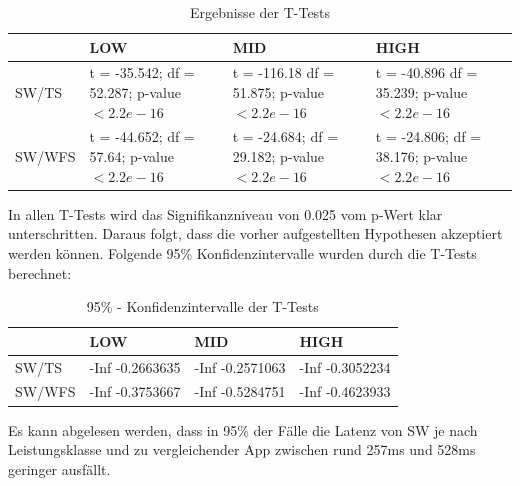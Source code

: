 \begin{table}[h]

\begin{tabular}{l|p{2cm}|p{2cm}|p{2cm}}
& LOW & MID & HIGH \\
\hline
SW/TS & t = -35.542; \newline df = 52.287; \newline p-value $< 2.2e-16$ & t = -116.18 \newline df = 51.875; \newline p-value $< 2.2e-16$ & t = -40.896 \newline df = 35.239; \newline p-value $< 2.2e-16$\\
\hline
SW/WFS & t = -44.652; \newline df = 57.64; \newline p-value $< 2.2e-16$ & t = -24.684; \newline df = 29.182; \newline p-value $< 2.2e-16$ & t = -24.806; \newline df = 38.176; \newline p-value $< 2.2e-16$ \\

\end{tabular}
\caption{Ergebnisse der T-Tests}
\end{table}

In allen T-Tests wird das Signifikanzniveau von 0.025 vom p-Wert klar unterschritten. Daraus folgt, dass die vorher aufgestellten Hypothesen akzeptiert werden können. Folgende 95\% Konfidenzintervalle wurden durch die T-Tests berechnet:

\begin{table}[h]

\begin{tabular}{l|p{2cm}|p{2cm}|p{2cm}}
& LOW & MID & HIGH \\
\hline
SW/TS & -Inf -0.2663635 & -Inf -0.2571063 & -Inf -0.3052234 \\
\hline
SW/WFS & -Inf -0.3753667 & -Inf -0.5284751 & -Inf -0.4623933 \\

\end{tabular}
\caption{95\% - Konfidenzintervalle der T-Tests}
\end{table}

Es kann abgelesen werden, dass in 95\% der Fälle die Latenz von SW je nach Leistungsklasse und zu vergleichender App zwischen rund 257ms und 528ms geringer ausfällt.